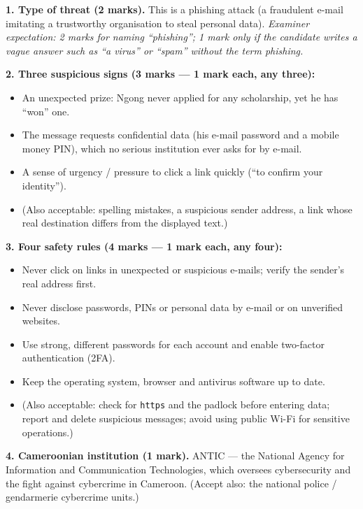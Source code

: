 \documentclass[11pt]{article}
\newcommand{\cle}[1]{{\popxbold\color{popdark}#1}}
\begin{document}
\begin{corrige}
\textbf{1. Type of threat (2 marks).} This is a \cle{phishing} attack (a fraudulent e-mail imitating a trustworthy organisation to steal personal data). \emph{Examiner expectation: 2 marks for naming ``phishing''; 1 mark only if the candidate writes a vague answer such as ``a virus'' or ``spam'' without the term phishing.}

\textbf{2. Three suspicious signs (3 marks — 1 mark each, any three):}
\begin{itemize}
\item An unexpected prize: Ngong never applied for any scholarship, yet he has ``won'' one.
\item The message requests confidential data (his e-mail password and a mobile money PIN), which no serious institution ever asks for by e-mail.
\item A sense of urgency / pressure to click a link quickly (``to confirm your identity'').
\item (Also acceptable: spelling mistakes, a suspicious sender address, a link whose real destination differs from the displayed text.)
\end{itemize}

\textbf{3. Four safety rules (4 marks — 1 mark each, any four):}
\begin{itemize}
\item Never click on links in unexpected or suspicious e-mails; verify the sender's real address first.
\item Never disclose passwords, PINs or personal data by e-mail or on unverified websites.
\item Use strong, different passwords for each account and enable two-factor authentication (2FA).
\item Keep the operating system, browser and antivirus software up to date.
\item (Also acceptable: check for \texttt{https} and the padlock before entering data; report and delete suspicious messages; avoid using public Wi-Fi for sensitive operations.)
\end{itemize}

\textbf{4. Cameroonian institution (1 mark).} \cle{ANTIC} — the National Agency for Information and Communication Technologies, which oversees cybersecurity and the fight against cybercrime in Cameroon. (Accept also: the national police / gendarmerie cybercrime units.)
\end{corrige}
\end{document}
